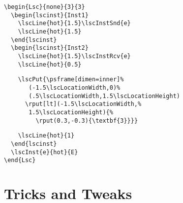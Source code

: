 \documentclass{article}
\begin{document}
\begin{center}%
%
\begin{minipage}{0.30\textwidth}
\end{minipage}
\hfill
\begin{minipage}{0.685\textwidth}%
\small%
{\gray\begin{verbatim}
\begin{Lsc}{none}{3}{3}
  \begin{lscinst}{Inst1}
    \lscLine{hot}{1.5}\lscInstSnd{e}
    \lscLine{hot}{1.5}
  \end{lscinst}
  \begin{lscinst}{Inst2}
    \lscLine{hot}{1.5}\lscInstRcv{e}
    \lscLine{hot}{0.5}
\end{verbatim}}%
\verbunskip%
{\begin{verbatim}
    \lscPut{\psframe[dimen=inner]%
       (-1.5\lscLocationWidth,0)%
       (.5\lscLocationWidth,1.5\lscLocationHeight)
      \rput[lt](-1.5\lscLocationWidth,%
       1.5\lscLocationHeight){%
         \rput(0.3,-0.3){\textbf{3}}}}
\end{verbatim}}%
\verbunskip%
{\gray\begin{verbatim}
    \lscLine{hot}{1}
  \end{lscinst}
  \lscInst{e}{hot}{E}
\end{Lsc}
\end{verbatim}}%
\end{minipage}
\end{center}%>@>
%>@>


\section{Tricks and Tweaks}
\label{sec:tricks}
\end{document}
